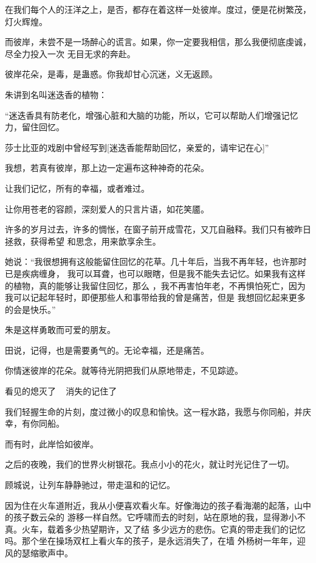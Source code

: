 \documentclass[12pt,a4paper]{article}
\begin{document}
		在我们每个人的汪洋之上，是否，都存在着这样一处彼岸。度过，便是花树繁茂，灯火辉煌。

		而彼岸，未尝不是一场醉心的谎言。如果，你一定要我相信，那么我便彻底虔诚，尽全力投入一次
	无目无求的奔赴。

		彼岸花朵，是毒，是蛊惑。你我却甘心沉迷，义无返顾。

		朱讲到名叫迷迭香的植物：

		“迷迭香具有防老化，增强心脏和大脑的功能，所以，它可以帮助人们增强记忆力，留住回忆。

		莎士比亚的戏剧中曾经写到[迷迭香能帮助回忆，亲爱的，请牢记在心]”


		我想，若真有彼岸，那上边一定遍布这种神奇的花朵。

		让我们记忆，所有的幸福，或者难过。

		让你用苍老的容颜，深刻爱人的只言片语，如花笑靥。

		许多的岁月过去，许多的惆怅，在窗子前开成雪花，又兀自融释。我们只有被昨日拯救，获得希望
	和思念，用来歆享余生。

		她说：“我很想拥有这般能留住回忆的花草。几十年后，当我不再年轻，也许那时已是疾病缠身，
	我可以耳聋，也可以眼瞎，但是我不能失去记忆。如果我有这样的植物，真的能够让我留住回忆，那么
	，我不再害怕年老，不再惧怕死亡，因为我可以记起年轻时，即便那些人和事带给我的曾是痛苦，但是
	我想回忆起来更多的会是快乐。”

		朱是这样勇敢而可爱的朋友。

		田说，记得，也是需要勇气的。无论幸福，还是痛苦。

		你情迷彼岸的花朵。就等待光阴把我们从原地带走，不见踪迹。

		看见的熄灭了 ~ 消失的记住了

		我们轻握生命的片刻，度过微小的叹息和愉快。这一程水路，我愿与你同船，并庆幸，有你同船。

		而有时，此岸恰如彼岸。

	\endwriting



		之后的夜晚，我们的世界火树银花。我点小小的花火，就让时光记住了一切。

		顾城说，让列车静静驰过，带走温和的记忆。

		因为住在火车道附近，我从小便喜欢看火车。好像海边的孩子看海潮的起落，山中的孩子数云朵的
	游移一样自然。它呼啸而去的时刻，站在原地的我，显得渺小不真。火车，载着多少热望期许，又了结
	多少远方的悲伤。它真的带走我们的记忆吗。那个坐在操场双杠上看火车的孩子，是永远消失了，在墙
	外杨树一年年，迎风的瑟缩歌声中。
\end{document}
